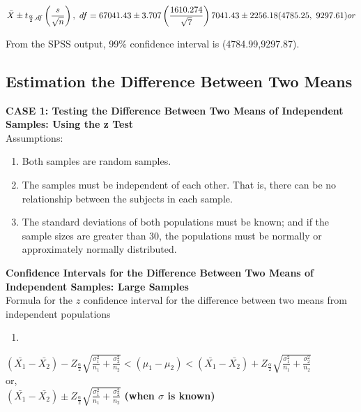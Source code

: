 \documentclass[
  a4paper,
  DIV=11,
  numbers=noendperiod,
  oneside]{scrreprt}
\providecommand{\tightlist}{%
  \setlength{\itemsep}{0pt}\setlength{\parskip}{0pt}}\usepackage{longtable,booktabs,array}
\begin{document}
\[
\bar{X} \pm t_{\frac{\alpha}{2},df}\left(\frac{s}{\sqrt{n}}\right),\ df=6\\
7041.43 \pm 3.707\left(\frac{1610.274}{\sqrt{7}}\right)\\
7041.43 \pm 2256.18 \\
(4785.25,\ 9297.61) \\
or
\]

From the SPSS output, 99\% confidence interval is (4784.99,9297.87).\\

\hypertarget{estimation-the-difference-between-two-means}{%
\subsection{\texorpdfstring{Estimation the Difference Between Two
Means\\
}{Estimation the Difference Between Two Means }}\label{estimation-the-difference-between-two-means}}

\textbf{CASE 1: Testing the Difference Between Two Means of Independent
Samples: Using the z Test}\\

Assumptions:\\

\begin{enumerate}
\def\labelenumi{\arabic{enumi}.}
\tightlist
\item
  Both samples are random samples.
\item
  The samples must be independent of each other. That is, there can be
  no relationship between the subjects in each sample.
\item
  The standard deviations of both populations must be known; and if the
  sample sizes are greater than 30, the populations must be normally or
  approximately normally distributed.
\end{enumerate}

\textbf{Confidence Intervals for the Difference Between Two Means of
Independent Samples: Large Samples}\\

Formula for the \(z\) confidence interval for the difference between two
means from independent populations\\

\begin{enumerate}
\def\labelenumi{\roman{enumi})}
\tightlist
\item
\end{enumerate}

\((\bar{X_1}-\bar{X_2})-Z_{\frac{\alpha}{2}}{\sqrt{\frac{\sigma_1^2}{n_1}+\frac{\sigma_2^2}{n_2}}}\lt(\mu_1-\mu_2)\lt(\bar{X_1}-\bar{X_2})+Z_{\frac{\alpha}{2}}{\sqrt{\frac{\sigma_1^2}{n_1}+\frac{\sigma_2^2}{n_2}}}\)\\
or,\\
\((\bar{X_1}-\bar{X_2})\pm Z_{\frac{\alpha}{2}}{\sqrt{\frac{\sigma_1^2}{n_1}+\frac{\sigma_2^2}{n_2}}}\)
\textbf{(when \(\sigma\) is known)}
\end{document}
